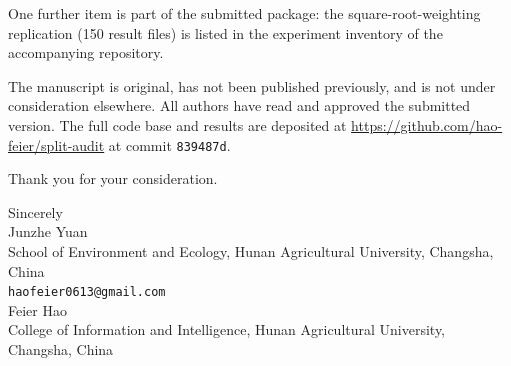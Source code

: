 \documentclass[11pt]{article}
\begin{document}
One further item is part of the submitted package: the square-root-weighting
replication (150 result files) is listed in the experiment inventory of the
accompanying repository.

The manuscript is original, has not been published previously, and is not
under consideration elsewhere. All authors have read and approved the
submitted version. The full code base and results are deposited at
\url{https://github.com/hao-feier/split-audit} at commit \texttt{839487d}.

Thank you for your consideration.

\vspace{1cm}

\noindent Sincerely\\
Junzhe Yuan\\
School of Environment and Ecology, Hunan Agricultural University, Changsha, China\\
\texttt{haofeier0613@gmail.com}\\[4pt]
Feier Hao\\
College of Information and Intelligence, Hunan Agricultural University, Changsha, China
\end{document}
